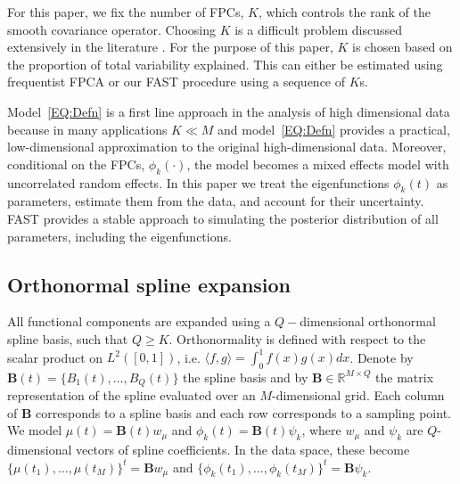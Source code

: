 \documentclass[12pt]{article}
\begin{document}
For this paper, we fix the number of FPCs, $K$, which controls the rank of the smooth covariance operator. Choosing $K$ is a difficult problem discussed extensively in the literature \citep{crainiceanu2024book, li_selecting_2013, yao_functional_2005}. For the purpose of this paper,  $K$ is chosen based on the proportion of total variability explained. This can either be estimated using frequentist FPCA or our FAST procedure using a sequence of $K$s.

Model~\eqref{EQ:Defn} is a first line approach in the analysis of high dimensional data \citep{crainiceanu2024book} because in many applications $K\ll M$ and model~\eqref{EQ:Defn} provides a practical, low-dimensional approximation to the original high-dimensional data. Moreover, conditional on the FPCs, $\phi_k(\cdot)$, the model becomes a mixed effects model with uncorrelated random effects. In this paper we treat the eigenfunctions $\phi_k(t)$ as parameters, estimate them from the data, and account for their uncertainty. FAST provides a stable approach to simulating the posterior distribution of all parameters, including the eigenfunctions.

\subsection{Orthonormal spline expansion}\label{subsec:osplines}

All functional components are expanded using a $Q-$dimensional orthonormal spline basis, such that $Q \geq K$. Orthonormality is defined with respect to the scalar product on $L^2([0,1])$, i.e. $\langle f, g \rangle = \int_0^1 f(x)g(x)dx$. Denote by $\mathbf{B}(t) = \{B_1(t),\ldots, B_Q(t)\}$ the spline basis and by $\mathbf{B} \in \mathbb{R}^{M \times Q}$ the matrix representation of the spline evaluated over an $M$-dimensional grid. Each column of $\mathbf{B}$ corresponds to a spline basis and each row corresponds to a sampling point. We model $\mu(t) = \mathbf{B}(t)w_\mu$ and $\phi_k(t) = \mathbf{B}(t)\psi_k$, where $w_{\mu}$ and $\psi_k$ are $Q$-dimensional vectors of spline coefficients. In the data space, these become $\{\mu(t_1), \ldots, \mu(t_M)\}^t = \mathbf{B}w_\mu$ and $\{\phi_k(t_1), \ldots, \phi_k(t_M)\}^t = \mathbf{B}\psi_k$. 
\end{document}
